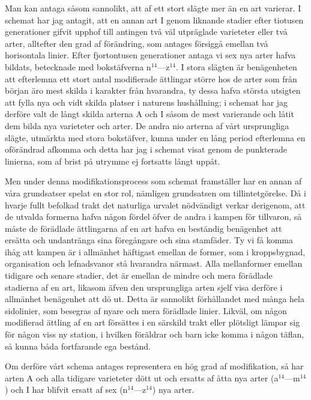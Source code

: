 Man kan antaga såsom sannolikt, att af ett stort slägte mer än en art varierar. I schemat har jag antagit, att en annan art I genom liknande stadier efter tiotusen generationer gifvit upphof till antingen två väl utpräglade varieteter eller två arter, alltefter den grad af förändring, som antages försiggå emellan två horisontala linier. Efter fjortontusen generationer antaga vi sex nya arter hafva bildats, betecknade med bokstäfverna n${}^{14}$—z${}^{14}$. I stora slägten är benägenheten att efterlemna ett stort antal modifierade ättlingar större hos de arter som från början äro mest skilda i karakter från hvarandra, ty dessa hafva största utsigten att fylla nya och vidt skilda platser i naturens hushållning; i schemat har jag derföre valt de långt skilda arterna A och I såsom de mest varierande och låtit dem bilda nya varieteter och arter. De andra nio arterna af vårt ursprungliga slägte, utmärkta med stora bokstäfver, kunna under en lång period efterlemna en oförändrad afkomma och detta har jag i schemat visat genom de punkterade linierna, som af brist på utrymme ej fortsatts långt uppåt.

Men under denna modifikationsprocess som schemat framställer har en annan af våra grundsatser spelat en stor rol, nämligen grundsatsen om tillintetgörelse. Då i hvarje fullt befolkad trakt det naturliga urvalet nödvändigt verkar derigenom, att de utvalda formerna hafva någon fördel öfver de andra i kampen för tillvaron, så måste de förädlade ättlingarna af en art hafva en beständig benägenhet att ersätta och undantränga sina föregångare och sina stamfäder. Ty vi få komma ihåg att kampen är i allmänhet häftigast emellan de former, som i kroppsbygnad, organisation och lefnadsvanor stå hvarandra närmast. Alla mellanformer emellan tidigare och senare stadier, det är emellan de mindre och mera förädlade stadierna af en art, likasom äfven den ursprungliga arten sjelf visa derföre i allmänhet benägenhet att dö ut. Detta är sannolikt förhållandet med många hela sidolinier, som besegras af nyare och mera förädlade linier. Likväl, om någon modifierad ättling af en art försättes i en särskild trakt eller plötsligt lämpar sig för någon viss ny station, i hvilken föräldrar och barn icke komma i någon täflan, så kunna båda fortfarande ega bestånd.

Om derföre vårt schema antages representera en hög grad af modifikation, så har arten A och alla tidigare varieteter dött ut och ersatts af åtta nya arter (a${}^{14}$—m${}^{14}$) och I har blifvit ersatt af sex (n${}^{14}$—z${}^{14}$) nya arter.

